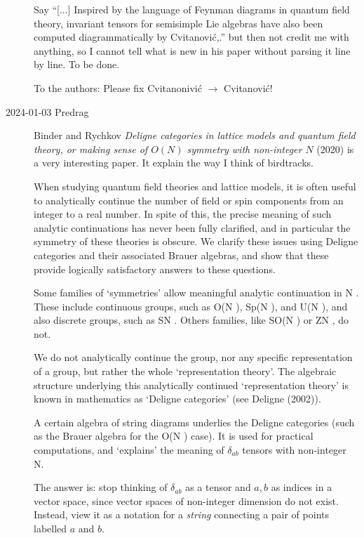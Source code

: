 \begin{description}
Say ``[...] Inspired by the language of Feynman diagrams in quantum field
theory, invariant tensors for semisimple Lie algebras have also been
computed diagrammatically by Cvitanovi{\'c},.'' but then not
credit me with anything,  so I cannot tell what is new in his paper
without parsing it line by line. To be done.

To the authors: Please fix Cvitanonivi{\'c} $\to$ Cvitanovi{\'c}!

\item[2024-01-03 Predrag]
Binder and Rychkov
{\em Deligne categories in lattice models and quantum field theory, or
making sense of {$O(N)$} symmetry with non-integer {$N$}}
(2020) is a very interesting paper. It explain the way I think of birdtracks.

When studying quantum field theories and lattice models, it is often useful
to analytically continue the number of field or spin components from an integer to a real
number. In spite of this, the precise meaning of such analytic continuations has never been
fully clarified, and in particular the symmetry of these theories is obscure. We clarify these
issues using Deligne categories and their associated Brauer algebras, and show that these
provide logically satisfactory answers to these questions.

Some families of `symmetries' allow meaningful analytic continuation in N . These
include continuous groups, such as O(N ), Sp(N ), and U(N ), and also discrete groups,
such as SN . Others families, like SO(N ) or ZN , do not.

We do not analytically continue the group, nor any specific representation of a group,
but rather the whole `representation theory'. The algebraic structure underlying this
analytically continued `representation theory' is known in mathematics as `Deligne
categories' (see 
{Deligne (2002)}).

A certain algebra of string diagrams underlies the Deligne categories
(such as the Brauer algebra for the O(N ) case). It is used for practical
computations, and `explains' the meaning of $\delta_{ab}$ tensors with
non-integer N.

The answer is: stop thinking of $\delta_{ab}$ as a tensor and ${a,b}$ as
indices in a vector space, since vector spaces of non-integer dimension
do not exist. Instead, view it as a notation for a \emph{string}
connecting a pair of points labelled ${a}$ and ${b}$.


\end{description}
